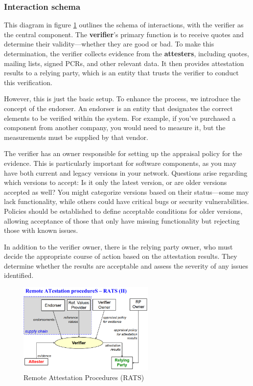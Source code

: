 \subsubsection{Interaction schema}

This diagram in figure \ref{fig:rats} outlines the schema of
interactions, with the verifier as the central component. The
\textbf{verifier}'s primary function is to receive quotes and
determine their validity—whether they are good or bad. To make this
determination, the verifier collects evidence from the
\textbf{attesters}, including quotes, mailing lists, signed PCRs, and
other relevant data. It then provides attestation results to a relying
party, which is an entity that trusts the verifier to conduct this
verification.

However, this is just the basic setup. To enhance the process, we
introduce the concept of the endorser. An endorser is an entity that
designates the correct elements to be verified within the system. For
example, if you've purchased a component from another company, you
would need to measure it, but the measurements must be supplied by
that vendor.

The verifier has an owner responsible for setting up the appraisal
policy for the evidence. This is particularly important for software
components, as you may have both current and legacy versions in your
network. Questions arise regarding which versions to accept: Is it
only the latest version, or are older versions accepted as well? You might
categorize versions based on their status—some may lack functionality,
while others could have critical bugs or security vulnerabilities.
Policies should be established to define acceptable conditions for
older versions, allowing acceptance of those that only have missing
functionality but rejecting those with known issues.

In addition to the verifier owner, there is the relying party owner,
who must decide the appropriate course of action based on the
attestation results. They determine whether the results are acceptable
and assess the severity of any issues identified.

\begin{figure}[H]
  \centering
  \includegraphics[width=0.6\textwidth]{img/RATS.png}
  \caption{Remote Attestation Procedures (RATS)}
  \label{fig:rats}
\end{figure}

